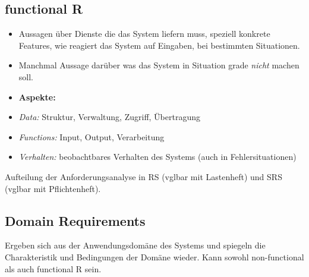 \subsection{functional R}
\begin{itemize}
	\item Aussagen über Dienste die das System liefern muss, speziell konkrete Features, wie reagiert das System auf Eingaben, bei bestimmten Situationen.
	\item Manchmal Aussage darüber was das System in Situation grade \textit{nicht} machen soll.
	\item \textbf{Aspekte:}
	\item \textit{Data:} Struktur, Verwaltung, Zugriff, Übertragung
	\item \textit{Functions:} Input, Output, Verarbeitung
	\item \textit{Verhalten:} beobachtbares Verhalten des Systems (auch in Fehlersituationen)
\end{itemize}

Aufteilung der Anforderungsanalyse in RS (vglbar mit Lastenheft) und SRS (vglbar mit Pflichtenheft).

\subsection{Domain Requirements}
Ergeben sich aus der Anwendungsdomäne des Systems und spiegeln die Charakteristik und Bedingungen der Domäne wieder. Kann sowohl non-functional als auch functional R sein.

